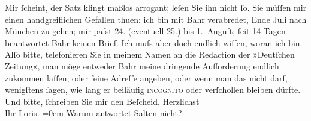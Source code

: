 \begin{ledgroupsized}[t]{13cm}
           \pstart
           Mir ſcheint, der Satz klingt maßlos arrogant; leſen Sie ihn nicht ſo.\pend
           \pstart
           Sie müſſen mir einen handgreiflichen Gefallen thuen: ich bin mit Bahr verabredet, Ende Juli nach München zu gehen; mir paſst 24.
               (eventuell 25.) bis 1. Auguſt; ſeit 14 Tagen beantwortet
                  Bahr keinen Brief. Ich muſs aber doch
               endlich wiſſen, {\pb}woran ich bin.
               Alſo bitte, telefonieren Sie in meinem Namen an die Redaction der »Deutſchen Zeitung«, man möge entweder Bahr meine dringende Aufforderung endlich zukommen laſſen, oder
               ſeine Adreſſe angeben, oder wenn man das nicht darf, wenigſtens ſagen, wie lang er
               beiläufig \textsc{incognito} oder verſchollen bleiben dürfte. Und
               bitte, ſchreiben Sie mir  den Beſcheid.\pend
           \pstart
           Herzlichst{\\[\baselineskip]}Ihr \spacefill\mbox{Loris.}\pend
           \leftskip=0em{}\pstart
           \noindent{}Warum antwortet Salten nicht?\pend
           
         
         \endnumbering{}\end{ledgroupsized}  \newcommand{\dateiname}{L00238}\newcommand{\titel}{Hugo von Hofmannsthal an Arthur Schnitzler, 19. 7. 1893}\newcommand{\editorInnen}{ Martin Anton Müller und Gerd-Hermann Susen}
      